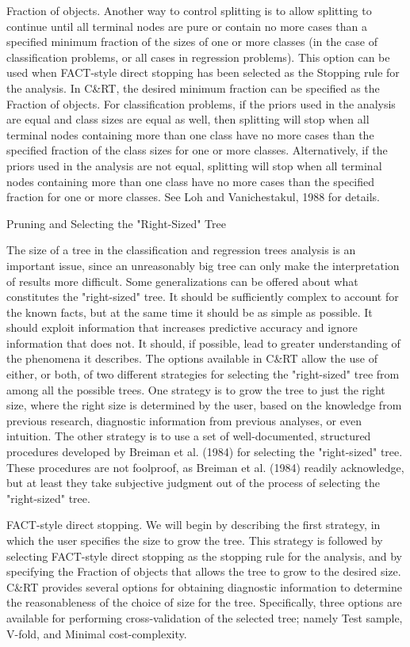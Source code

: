 Fraction of objects. Another way to control splitting is to allow splitting to continue until all terminal nodes are pure or contain no more cases than a specified minimum fraction of the sizes of one or more classes (in the case of classification problems, or all cases in regression problems). This option can be used when FACT-style direct stopping has been selected as the Stopping rule for the analysis. In C&RT, the desired minimum fraction can be specified as the Fraction of objects. For classification problems, if the priors used in the analysis are equal and class sizes are equal as well, then splitting will stop when all terminal nodes containing more than one class have no more cases than the specified fraction of the class sizes for one or more classes. Alternatively, if the priors used in the analysis are not equal, splitting will stop when all terminal nodes containing more than one class have no more cases than the specified fraction for one or more classes. See Loh and Vanichestakul, 1988 for details.

Pruning and Selecting the "Right-Sized" Tree

The size of a tree in the classification and regression trees analysis is an important issue, since an unreasonably big tree can only make the interpretation of results more difficult. Some generalizations can be offered about what constitutes the "right-sized" tree. It should be sufficiently complex to account for the known facts, but at the same time it should be as simple as possible. It should exploit information that increases predictive accuracy and ignore information that does not. It should, if possible, lead to greater understanding of the phenomena it describes. The options available in C&RT allow the use of either, or both, of two different strategies for selecting the "right-sized" tree from among all the possible trees. One strategy is to grow the tree to just the right size, where the right size is determined by the user, based on the knowledge from previous research, diagnostic information from previous analyses, or even intuition. The other strategy is to use a set of well-documented, structured procedures developed by Breiman et al. (1984) for selecting the "right-sized" tree. These procedures are not foolproof, as Breiman et al. (1984) readily acknowledge, but at least they take subjective judgment out of the process of selecting the "right-sized" tree.

FACT-style direct stopping. We will begin by describing the first strategy, in which the user specifies the size to grow the tree. This strategy is followed by selecting FACT-style direct stopping as the stopping rule for the analysis, and by specifying the Fraction of objects that allows the tree to grow to the desired size. C&RT provides several options for obtaining diagnostic information to determine the reasonableness of the choice of size for the tree. Specifically, three options are available for performing cross-validation of the selected tree; namely Test sample, V-fold, and Minimal cost-complexity.

